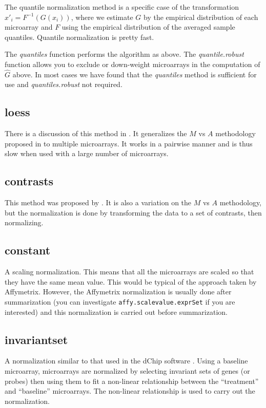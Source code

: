 The quantile normalization method is a specific case of the transformation $x'_{i} = F^{-1}\left(G\left(x_{i}\right)\right)$, where we estimate $G$ by the empirical distribution of each microarray and $F$ using the empirical distribution of the averaged sample quantiles.  Quantile normalization is pretty fast.

The \emph{quantiles} function performs the algorithm as above. The \emph{quantile.robust} function allows you to exclude or down-weight microarrays in the computation of $\hat G$ above. In most cases we have found that the \emph{quantiles} method is sufficient for use and \emph{quantiles.robust} not required.

\subsection{loess}

There is a discussion of this method in \cite{PMID_12538238}. It generalizes the $M$ vs $A$ methodology proposed in \cite{Dudoit:2002} to multiple microarrays. It works in a pairwise manner and is thus slow when used with a large number of microarrays.

\subsection{contrasts}

This method was proposed by \cite{astr:2003}. It is also a variation on the  $M$ vs $A$ methodology, but the normalization is done by transforming the data to a set of contrasts, then normalizing.

\subsection{constant}

A scaling normalization. This means that all the microarrays are scaled so that they have the same mean value. This would be typical of the approach taken by Affymetrix. However, the Affymetrix normalization is usually done after summarization (you can investigate \verb+affy.scalevalue.exprSet+ if you are interested) and this normalization is carried out before summarization.

\subsection{invariantset}

A normalization similar to that used in the dChip software \cite{PMID_11134512,PMID_11532216}. Using a baseline microarray, microarrays are normalized by selecting invariant sets of genes (or probes) then using them to fit a non-linear relationship between the ``treatment'' and ``baseline'' microarrays. The non-linear relationship is used to carry out the normalization.

